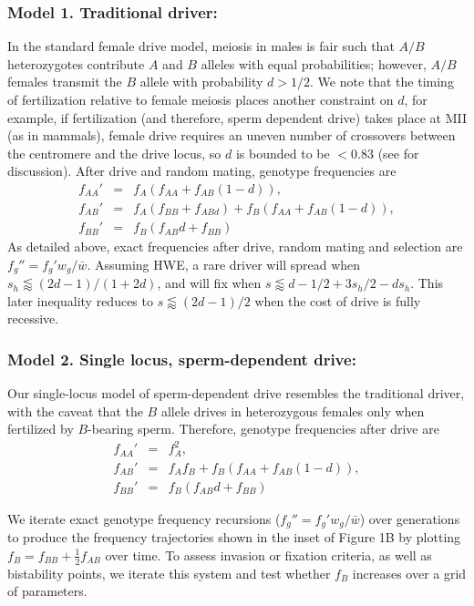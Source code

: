 \documentclass{pnastwo}
\begin{document}
\begin{article}
\subsubsection{Model 1. Traditional driver:}
In the standard female drive model, meiosis in males is fair such that $A/B$ heterozygotes contribute $A$ and $B$ alleles with equal probabilities; however, $A/B$ females transmit the $B$ allele with probability $d>1/2$.  
We note that the timing of fertilization relative to female meiosis places another constraint on $d$, for example, if fertilization (and therefore, sperm dependent drive) takes place at MII (as in mammals),
	female drive requires an uneven number of crossovers between the centromere and the drive locus, 
	so $d$ is bounded to be $<0.83$ (see \cite{Buckler1999} for discussion). 
After drive and random mating, genotype frequencies are 
\begin{eqnarray*}
f_{AA}'&=&f_A (f_{AA }+ f_{AB} (1 - d)),\\
f_{AB}'&=&f_A (f_{BB} + f_{ABd}) + f_B (f_{AA} + f_{AB} (1 - d)),\\
f_{BB}'&=& f_B (f_{AB} d + f_{BB})
\end{eqnarray*}
As detailed above, exact frequencies after drive, random mating and selection are $f_g''= f_g'w_g/\bar{w}$. 
Assuming HWE, a rare driver will spread when $s_h
        \lessapprox(2d-1)/(1+2d)$, and will fix when $s\lessapprox d -1/2 +
        3 s_h /2- d s_h$. This later inequality reduces to
        $s\lessapprox(2d-1)/2$ when the cost of drive is fully
        recessive. 

\subsubsection{Model 2. Single locus, sperm-dependent drive:}
Our single-locus model of sperm-dependent drive resembles the traditional driver, with the caveat that the $B$ allele drives in heterozygous females only when fertilized by $B$-bearing sperm. 
Therefore, genotype frequencies after drive are 
\begin{eqnarray*}
f_{AA}'&=&f_A^2,\\
f_{AB}'&=&f_A f_B+f_B (f_{AA} + f_{AB}(1 - d)) ,\\
f_{BB}'&=&f_B (f_{AB} d + f_{BB} )
\end{eqnarray*}

We iterate exact genotype frequency recursions ($f_g''= f_g'w_g/\bar{w}$) over generations to produce the frequency trajectories shown in the inset of
Figure 1B by plotting $f_B=f_{BB}+ \frac{1}{2}f_{AB}$
over time. 
To assess invasion or fixation criteria, as well as bistability points, we iterate this system and
test whether $f_B$ increases over a grid of parameters. 


\end{article}
\end{document}

